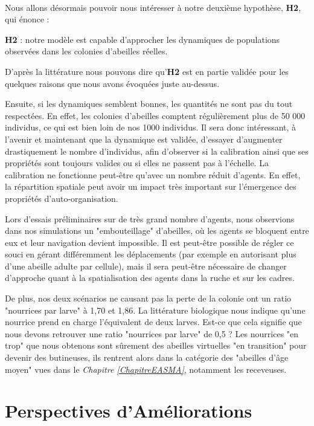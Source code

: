 	\paragraph{}
		Nous allons désormais pouvoir nous intéresser à notre deuxième hypothèse, \textbf{H2}, qui énonce : 
		
		 \textbf{H2} : notre modèle est capable d'approcher les dynamiques de populations observées dans les colonies d'abeilles réelles.
		 
		 D'après la littérature nous pouvons dire qu'\textbf{H2} est en partie validée pour les quelques raisons que nous avons évoquées juste au-dessus. 
		 
		 Ensuite, si les dynamiques semblent bonnes, les quantités ne sont pas du tout respectées. En effet, les colonies d'abeilles comptent régulièrement plus de 50 000 individus, ce qui est bien loin de nos 1000 individus. Il sera donc intéressant, à l'avenir et maintenant que la dynamique est validée, d'essayer d'augmenter drastiquement le nombre d'individus, afin d'observer si la calibration ainsi que ses propriétés sont toujours valides ou si elles ne passent pas à l'échelle. La calibration ne fonctionne peut-être qu'avec un nombre réduit d'agents. En effet, la répartition spatiale peut avoir un impact très important sur l'émergence des propriétés d'auto-organisation. 
		 
		 Lors d'essais préliminaires sur de très grand nombre d'agents, nous observions dans nos simulations un "embouteillage" d'abeilles, où les agents se bloquent entre eux et leur navigation devient impossible. Il est peut-être possible de régler ce souci en gérant différemment les déplacements (par exemple en autorisant plus d'une abeille adulte par cellule), mais il sera peut-être nécessaire de changer d'approche quant à la spatialisation des agents dans la ruche et sur les cadres.
		 
		 De plus, nos deux scénarios ne causant pas la perte de la colonie ont un ratio "nourrices par larve" à 1,70 et 1,86. La littérature biologique nous indique qu'une nourrice prend en charge l'équivalent de deux larves. Est-ce que cela signifie que nous devons retrouver une ratio "nourrices par larve" de 0,5 ? Les nourrices "en trop" que nous obtenons sont sûrement des abeilles virtuelles "en transition" pour devenir des butineuses, ils rentrent alors dans la catégorie des "abeilles d'âge moyen" vues dans le \textit{Chapitre \ref{ChapitreEASMA}}, notamment les receveuses.
	
	
	\section{Perspectives d'Améliorations}
	\label{sectionPerspectivesSMA}
	
